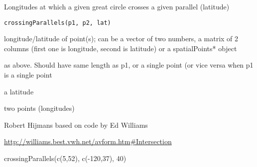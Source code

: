 \begin{Description}\relax
Longitudes at which a given great circle crosses a given parallel (latitude)
\end{Description}
\begin{Usage}
\begin{verbatim}
crossingParallels(p1, p2, lat) 
\end{verbatim}
\end{Usage}
\begin{Arguments}
\begin{ldescription}
\item[\code{p1}] longitude/latitude of point(s); can be a vector of two numbers, a matrix of 2 columns (first one is longitude, second is latitude) or a spatialPoints* object
\item[\code{p2}] as above. Should have same length as p1, or a single point (or vice versa when p1 is a single point
\item[\code{lat}] a latitude
\end{ldescription}
\end{Arguments}
\begin{Value}
two points (longitudes)
\end{Value}
\begin{Author}\relax
Robert Hijmans based on code by Ed Williams
\end{Author}
\begin{References}\relax
\url{http://williams.best.vwh.net/avform.htm#Intersection}
\end{References}
\begin{Examples}
\begin{ExampleCode}
crossingParallels(c(5,52), c(-120,37), 40)
\end{ExampleCode}
\end{Examples}

